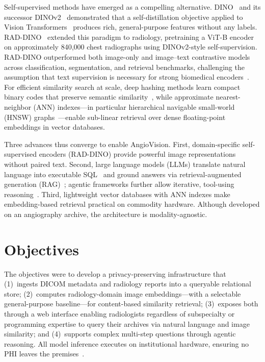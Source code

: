 \documentclass[11pt]{article}
\begin{document}
Self-supervised methods have emerged as a compelling alternative.
DINO~\cite{caron2021dino} and its successor DINOv2~\cite{oquab2024dinov2}
demonstrated that a self-distillation objective applied to Vision
Transformers~\cite{dosovitskiy2021vit} produces rich, general-purpose features
without any labels. RAD-DINO~\cite{perezgarcia2024raddino} extended this
paradigm to radiology, pretraining a ViT-B encoder on approximately 840{,}000
chest radiographs using DINOv2-style self-supervision. RAD-DINO outperformed
both image-only and image--text contrastive models across classification,
segmentation, and retrieval benchmarks, challenging the assumption that text
supervision is necessary for strong biomedical
encoders~\cite{perezgarcia2024raddino}. For efficient similarity search at
scale, deep hashing methods learn compact binary codes that preserve semantic
similarity~\cite{zheng2021ath}, while approximate nearest-neighbor (ANN)
indexes---in particular hierarchical navigable small-world (HNSW)
graphs~\cite{malkov2020hnsw}---enable sub-linear retrieval over dense
floating-point embeddings in vector databases.

Three advances thus converge to enable AngioVision. First, domain-specific
self-supervised encoders (RAD-DINO) provide powerful image representations
without paired text. Second, large language models (LLMs) translate natural
language into executable SQL~\cite{yu2018spider,pourreza2023dinsql} and ground
answers via retrieval-augmented generation
(RAG)~\cite{lewis2020rag,weinert2025rag}; agentic frameworks further allow
iterative, tool-using reasoning~\cite{yao2023react,wang2024codeact}. Third,
lightweight vector databases with ANN indexes make embedding-based retrieval
practical on commodity hardware. Although developed on an angiography archive,
the architecture is modality-agnostic.

\section{Objectives}

The objectives were to develop a privacy-preserving infrastructure that
(1)~ingests DICOM metadata and radiology reports into a queryable relational
store; (2)~computes radiology-domain image embeddings---with a selectable
general-purpose baseline---for content-based similarity retrieval; (3)~exposes
both through a web interface enabling
radiologists regardless of subspecialty or programming expertise to query their
archives via natural language and image similarity; and (4)~supports complex
multi-step questions through agentic reasoning. All model inference executes on
institutional hardware, ensuring no PHI leaves the
premises~\cite{thirunavukarasu2023llmmed,singhal2023clinical}.
\end{document}
